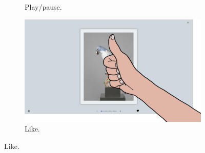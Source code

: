 \begin{figure}[ht]
\begin{subfigure}{.24\textwidth}
        \vspace{-6pt}
        \captionsetup{width=.9\linewidth}
        \caption{Play/pause.}
        \label{fig:lui:gestures:play-pause}
    \end{subfigure}
    \begin{subfigure}{.24\textwidth}
        \centering
        \includegraphics[width=.97\linewidth]{Figures/LUI/Gestures/thumb_up.pdf} 
        \vspace{-6pt}
        \captionsetup{width=.9\linewidth}
        \caption{Like.}
        \label{fig:lui:gestures:like}
    \end{subfigure}


\end{figure}
